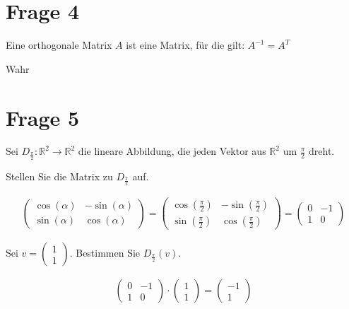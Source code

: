 \section{Frage 4}

Eine orthogonale Matrix $A$ ist eine Matrix, für die gilt: $A^{-1} = A^T$

Wahr

\section{Frage 5}

Sei $D_{\frac{\pi}{2}}: \mathbb{R}^2 \rightarrow \mathbb{R}^2$ die lineare
Abbildung, die jeden Vektor aus $\mathbb{R}^2$ um $\frac{\pi}{2}$ dreht.

Stellen Sie die Matrix zu $D_{\frac{\pi}{2}}$ auf.

\begin{align*}
    \begin{pmatrix}
        \cos(\alpha) & -\sin(\alpha) \\
        \sin(\alpha) & \cos(\alpha)
    \end{pmatrix} = \begin{pmatrix}
                        \cos(\frac{\pi}{2}) & -\sin(\frac{\pi}{2}) \\
                        \sin(\frac{\pi}{2}) & \cos(\frac{\pi}{2})
                    \end{pmatrix} = \begin{pmatrix}
                                        0 & -1 \\
                                        1 & 0
                                    \end{pmatrix}
\end{align*}

Sei $v = \begin{pmatrix}
        1 \\ 1
    \end{pmatrix}$. Bestimmen Sie $D_{\frac{\pi}{2}}(v)$.

\begin{align*}
    \begin{pmatrix}
        0 & -1 \\
        1 & 0
    \end{pmatrix} \cdot \begin{pmatrix}
                            1 \\ 1
                        \end{pmatrix} = \begin{pmatrix}
                                            -1 \\ 1
                                        \end{pmatrix}
\end{align*}

